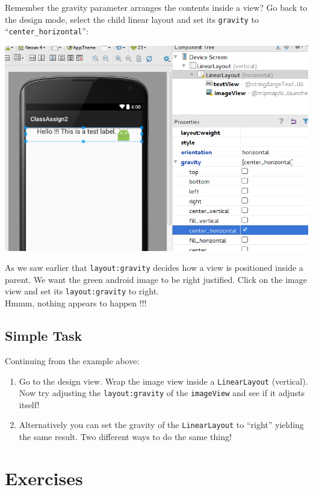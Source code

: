 Remember the gravity parameter arranges the contents inside a view? Go back to the design mode, select the child linear layout and set its \texttt{gravity} to ``\texttt{center\_horizontal}'':

\begin{center}
	\includegraphics[scale=0.4]{chapters/ch03/images/26}
\end{center}

As we saw earlier that \texttt{layout:gravity} decides how a view is positioned inside a parent. We want the green android image to be right justified. Click on the image view and set its \texttt{layout:gravity} to right. \\

Hmmm, nothing appears to happen !!!

\subsection{Simple Task}
Continuing from the example above:

\begin{enumerate}
	\item Go to the design view. Wrap the image view inside a \texttt{LinearLayout} (vertical). Now try adjusting
	the \texttt{layout:gravity} of the \texttt{imageView} and see if it adjusts itself!
	\item Alternatively you can set the gravity of the \texttt{LinearLayout} to ``right'' yielding the same result. Two
	different ways to do the same thing!
\end{enumerate}

\section{Exercises}

